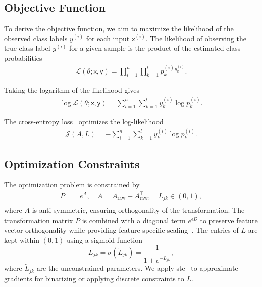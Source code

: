 \documentclass[lettersize,journal]{IEEEtran}
\begin{document}
\subsection{Objective Function}
To derive the objective function, we aim to maximize the likelihood of the observed class labels \( y^{(i)} \) for each input \( \mathsf{x}^{(i)} \). The likelihood of observing the true class label \( y^{(i)} \) for a given sample is the product of the estimated class probabilities
\begin{align}
    \mathcal{L}(\theta; \mathsf{x}, \mathsf{y}) = \prod_{i=1}^{n} \prod_{k=1}^{l} p_k^{(i)}{}^{y_k^{(i)}}.
\end{align}

Taking the logarithm of the likelihood gives
\begin{align}
    \log \mathcal{L}(\theta; \mathsf{x}, \mathsf{y}) = \sum_{i=1}^{n} \sum_{k=1}^{l} y_k^{(i)} \log p_k^{(i)}.
\end{align}

The cross-entropy loss~\cite{bilmes1998gentle} optimizes the log-likelihood
\begin{align}
    \mathcal{J}(A, L) = -\sum_{i=1}^{n} \sum_{k=1}^{l} y_k^{(i)} \log p_k^{(i)}.
\end{align}
\subsection{Optimization Constraints}
The optimization problem is constrained by
\begin{equation}
\begin{aligned}
P &= e^{A}, \quad A = A_{\text{raw}} - A_{\text{raw}}^\top, \quad L_{jk} \in (0,1),\\
\end{aligned}
\end{equation}
where \(A\) is anti-symmetric, ensuring orthogonality of the transformation. The transformation matrix \(P\) is combined with a diagonal term $e^{\epsilon D}$ to preserve feature vector orthogonality while providing feature-specific scaling~\cite{hu2020brief}. The entries of \(L\) are kept within \( (0,1) \) using a sigmoid function
\begin{equation}
L_{jk} = \sigma(\tilde{L}_{jk}) = \frac{1}{1 + e^{-\tilde{L}_{jk}}},
\end{equation}
where \( \tilde{L}_{jk} \) are the unconstrained parameters. We apply \Gls{ste}~\cite{bengio2013estimating} to approximate gradients for binarizing or applying discrete constraints to \(L\).
\end{document}
